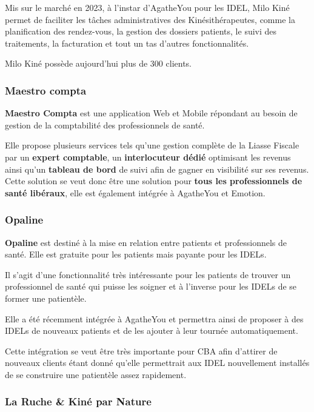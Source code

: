 \documentclass{article}
\begin{document}
Mis sur le marché en 2023, à l'instar d'AgatheYou pour les IDEL, Milo Kiné permet de faciliter les tâches administratives des Kinésithérapeutes, comme la planification des rendez-vous, la gestion des dossiers patients, le suivi des traitements, la facturation et tout un tas d'autres fonctionnalités.

Milo Kiné possède aujourd'hui plus de 300 clients.

\subsubsection{Maestro compta}
\textbf{Maestro Compta} est une application Web et Mobile répondant au besoin de gestion de la comptabilité des professionnels de santé.

Elle propose plusieurs services tels qu'une gestion complète de la Liasse Fiscale par un \textbf{expert comptable}, un \textbf{interlocuteur dédié} optimisant les revenus ainsi qu'un \textbf{tableau de bord} de suivi afin de gagner en visibilité sur ses revenus. \\

Cette solution se veut donc être une solution pour \textbf{tous les professionnels de santé libéraux}, elle est également intégrée à AgatheYou et Emotion.

\subsubsection{Opaline}

\textbf{Opaline} est destiné à la mise en relation entre patients et professionnels de santé.
Elle est gratuite pour les patients mais payante pour les IDELs.

Il s'agit d'une fonctionnalité très intéressante pour les patients de trouver un professionnel de santé qui puisse les soigner et à l'inverse pour les IDELs de se former une patientèle.

Elle a été récemment intégrée à AgatheYou et permettra ainsi de proposer à des IDELs de nouveaux patients et de les ajouter à leur tournée automatiquement.

Cette intégration se veut être très importante pour CBA afin d'attirer de nouveaux clients étant donné qu'elle permettrait aux IDEL nouvellement installés de se construire une patientèle assez rapidement.

\subsubsection{La Ruche \& Kiné par Nature}
\end{document}
